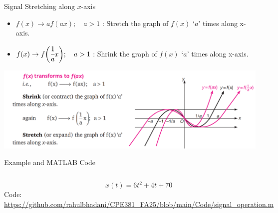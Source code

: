 \documentclass[aspectratio=169,xcolor=dvipsnames,svgnames,x11names,fleqn]{beamer}
\begin{document}
\begin{frame}{Signal Stretching along $x$-axis}

    \begin{itemize}
    \item $f(x) \to a f(ax); \quad a > 1$ : Stretch the graph of $f(x)$ `$a$' times along x-axis.
    \item $f(x) \to f\bigg(\cfrac{1}{a} x\bigg); \quad a > 1$ : Shrink the graph of $f(x)$ `$a$' times along x-axis.
    
    \end{itemize}

       \includegraphics[width=0.9\linewidth,trim=0 0 0 0cm,clip]{figures/Signal_Sretch2.png}

\end{frame}

\begin{frame}{Example and MATLAB Code}


\begin{columns}
    $$
x(t) = 6t^2 + 4t + 70
$$
Code: \url{https://github.com/rahulbhadani/CPE381_FA25/blob/main/Code/signal_operation.m}

        \includegraphics[width=0.99\linewidth,trim=0 0.0 0 1.0cm,clip]{figures/signal_operations.pdf}

\end{columns}
    
\end{frame}
\end{document}
